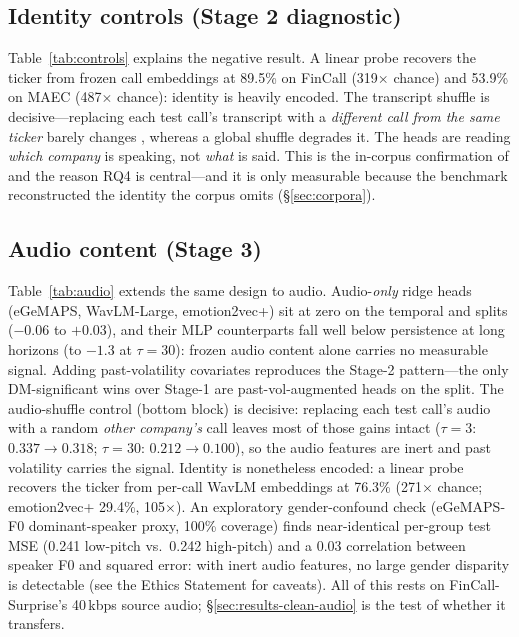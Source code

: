 

\subsection{Identity controls (Stage 2 diagnostic)}
Table~\ref{tab:controls} explains the negative result. A linear probe recovers the
ticker from frozen call embeddings at 89.5\% on FinCall (319$\times$ chance) and
53.9\% on MAEC (487$\times$ chance): identity is heavily encoded. The transcript
shuffle is decisive---replacing each test call's transcript with a \emph{different
call from the same ticker} barely changes \Rtwo, whereas a global shuffle degrades
it. The heads are reading \emph{which company} is speaking, not \emph{what} is said.
This is the in-corpus confirmation of \citet{scss2024} and the reason RQ4 is
central---and it is only measurable because the benchmark reconstructed the
identity the corpus omits (\S\ref{sec:corpora}).



\subsection{Audio content (Stage 3)}
Table~\ref{tab:audio} extends the same design to audio. Audio-\emph{only} ridge heads
(eGeMAPS, WavLM-Large, emotion2vec+) sit at \Rtwo{} zero on the temporal and
\tickerdisjoint{} splits ($-0.06$ to $+0.03$), and their MLP counterparts fall
well below persistence at long horizons (to $-1.3$ at $\tau{=}30$): frozen audio
content alone carries no measurable \dv{} signal. Adding past-volatility covariates reproduces the Stage-2
pattern---the only DM-significant wins over Stage-1 are past-vol-augmented heads on
the \tickerdisjoint{} split. The audio-shuffle control (bottom block) is decisive:
replacing each test call's audio with a random \emph{other company's} call leaves
most of those gains intact ($\tau{=}3$: $0.337\!\to\!0.318$; $\tau{=}30$:
$0.212\!\to\!0.100$), so the audio features are inert and past volatility carries
the signal. Identity is nonetheless encoded: a linear probe recovers the ticker from
per-call WavLM embeddings at 76.3\% (271$\times$ chance; emotion2vec+ 29.4\%,
105$\times$). An exploratory gender-confound check (eGeMAPS-F0 dominant-speaker
proxy, 100\% coverage) finds near-identical per-group test MSE (0.241 low-pitch
vs.\ 0.242 high-pitch) and a 0.03 correlation between speaker F0 and squared error:
with inert audio features, no large gender disparity is detectable (see the Ethics
Statement for caveats). All of this rests on FinCall-Surprise's 40\,kbps source
audio; \S\ref{sec:results-clean-audio} is the test of whether it transfers.

